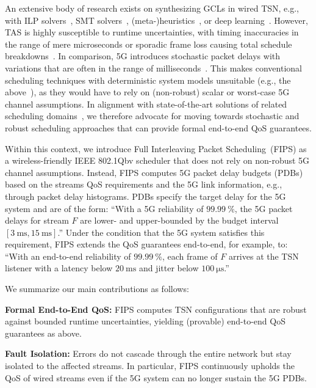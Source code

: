 An extensive body of research exists on synthesizing GCLs in wired TSN, e.g., with ILP solvers~\cite{10.1145/3139258.3139289}, SMT solvers~\cite{8894249}, (meta-)heuristics~\cite{nwps}, or deep learning~\cite{10228875}.
However, TAS is highly susceptible to runtime uncertainties, with timing inaccuracies in the range of mere microseconds or sporadic frame loss causing total schedule breakdowns~\cite{Craciunas2016RTNS}.
In comparison, 5G introduces stochastic packet delays with variations that are often in the range of milliseconds~\cite{downlink_example_histogram}.
This makes conventional scheduling techniques with deterministic system models unsuitable (e.g., the above~\cite{nwps,10228875,10.1145/3139258.3139289,8894249}), as they would have to rely on (non-robust) scalar or worst-case 5G channel assumptions.
In alignment with state-of-the-art solutions of related scheduling domains~\cite{infocom24_best_paper,diaz2023robust}, we therefore advocate for moving towards stochastic and robust scheduling approaches that can provide formal end-to-end QoS guarantees.

Within this context, we introduce Full Interleaving Packet Scheduling~(FIPS) as a wireless-friendly IEEE 802.1Qbv scheduler that does not rely on non-robust 5G channel assumptions.
Instead, FIPS computes 5G packet delay budgets (PDBs) based on the streams QoS requirements and the 5G link information, e.g., through packet delay histograms.
PDBs specify the target delay for the 5G system and are of the form:
``With a 5G reliability of $\qty{99.99}{\percent}$, the 5G packet delays for stream $F$ are lower- and upper-bounded by the budget interval $[\qty{3}{\ms}, \qty{15}{\ms}]$.''
Under the condition that the 5G system satisfies this requirement, FIPS extends the QoS guarantees end-to-end, for example, to:
``With an end-to-end reliability of $\qty{99.99}{\percent}$, each frame of $F$ arrives at the TSN listener with a latency below $\qty{20}{\ms}$ and jitter below $\qty{100}{\us}$.''

We summarize our main contributions as follows:

\textbf{Formal End-to-End QoS:}
FIPS computes TSN configurations that are robust against bounded runtime uncertainties, yielding (provable) end-to-end QoS guarantees as above.

\textbf{Fault Isolation:}
Errors do not cascade through the entire network but stay isolated to the affected streams.
In particular, FIPS continuously upholds the QoS of wired streams even if the 5G system can no longer sustain the 5G PDBs.

